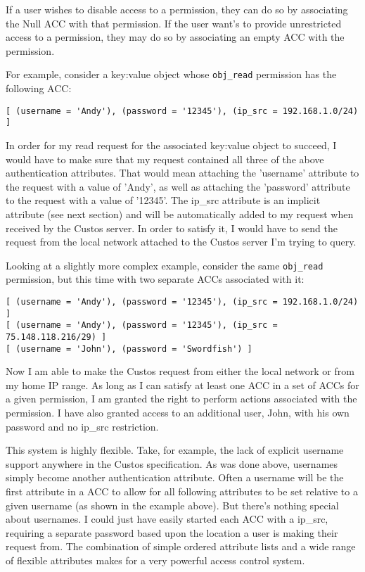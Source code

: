 If a user wishes to disable access to a permission, they can do so by
associating the Null ACC with that permission. If the user want's to
provide unrestricted access to a permission, they may do so by
associating an empty ACC with the permission.

For example, consider a key:value object whose \texttt{obj\_read}
permission has the following ACC:

\begin{Verbatim}[samepage=true]
[ (username = 'Andy'), (password = '12345'), (ip_src = 192.168.1.0/24) ]
\end{Verbatim}

In order for my read request for the associated key:value object to
succeed, I would have to make sure that my request contained all three
of the above authentication attributes. That would mean attaching the
'username' attribute to the request with a value of 'Andy', as well as
attaching the 'password' attribute to the request with a value of
'12345'. The ip\_src attribute is an implicit attribute (see next
section) and will be automatically added to my request when received by
the Custos server. In order to satisfy it, I would have to send the
request from the local network attached to the Custos server I'm
trying to query.

Looking at a slightly more complex example, consider the same
\texttt{obj\_read} permission, but this time with two separate ACCs
associated with it:

\begin{Verbatim}[samepage=true]
[ (username = 'Andy'), (password = '12345'), (ip_src = 192.168.1.0/24) ]
[ (username = 'Andy'), (password = '12345'), (ip_src = 75.148.118.216/29) ]
[ (username = 'John'), (password = 'Swordfish') ]
\end{Verbatim}

Now I am able to make the Custos request from either the local network
or from my home IP range. As long as I can satisfy at least one ACC in
a set of ACCs for a given permission, I am granted the right to
perform actions associated with the permission. I have also granted
access to an additional user, John, with his own password and no
ip\_src restriction.

This system is highly flexible. Take, for example, the lack of
explicit username support anywhere in the Custos specification. As was
done above, usernames simply become another authentication
attribute. Often a username will be the first attribute in a ACC to
allow for all following attributes to be set relative to a given
username (as shown in the example above). But there's nothing special
about usernames. I could just have easily started each ACC with a
ip\_src, requiring a separate password based upon the location a user
is making their request from. The combination of simple ordered
attribute lists and a wide range of flexible attributes makes for a
very powerful access control system.

